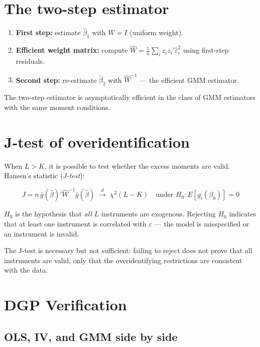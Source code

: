 \section{The two-step estimator}

\begin{enumerate}
  \item \textbf{First step:} estimate $\hat\beta_1$ with $W = I$ (uniform weight).
  \item \textbf{Efficient weight matrix:} compute $\hat W = \tfrac{1}{n}
        \sum_i z_i z_i' \hat\varepsilon_i^2$ using first-step residuals.
  \item \textbf{Second step:} re-estimate $\hat\beta_2$ with $\hat W^{-1}$ ---
        the efficient GMM estimator.
\end{enumerate}

The two-step estimator is asymptotically efficient in the class of GMM
estimators with the same moment conditions.

\section{J-test of overidentification}

When $L > K$, it is possible to test whether the excess moments are valid.
Hansen's statistic (\emph{J-test}):

\[
  J = n\, \bar g(\hat\beta)' \hat W^{-1} \bar g(\hat\beta)
  \;\xrightarrow{d}\; \chi^2(L - K)
  \quad \text{under } H_0: E[g_i(\beta_0)] = 0
\]

$H_0$ is the hypothesis that \emph{all} $L$ instruments are exogenous.
Rejecting $H_0$ indicates that at least one instrument is correlated with
$\varepsilon$ --- the model is misspecified or an instrument is invalid.

\begin{aviso}
  The J-test is necessary but not sufficient: failing to reject does not prove that all
  instruments are valid, only that the overidentifying restrictions are
  consistent with the data.
\end{aviso}

\section{DGP Verification}

\subsection*{OLS, IV, and GMM side by side}

